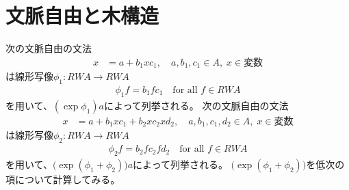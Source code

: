 \section{文脈自由と木構造}\label{s1:文脈自由と木構造} %
	次の文脈自由の文法
	\begin{equation*}\begin{split} %
		x &= a + b_1xc_1, \quad a,b_1,c_1\in A, \;x\in\text{変数}
	\end{split}\end{equation*} %
	は線形写像$\phi_1:RWA\to RWA$
	\begin{equation*}\begin{split} %
		\phi_1 f = b_1fc_1 \quad\text{for all }f\in RWA
	\end{split}\end{equation*} %
	を用いて、$(\exp \phi_1)a$によって列挙される。
	次の文脈自由の文法
	\begin{equation*}\begin{split} %
		x &= a + b_1xc_1 + b_2xc_2xd_2, 
		\quad a,b_1,c_1,d_2\in A, \;x\in\text{変数}
	\end{split}\end{equation*} %
	は線形写像$\phi_2:RWA\to RWA$
	\begin{equation*}\begin{split} %
		\phi_2 f = b_2fc_2fd_2 \quad\text{for all }f\in RWA
	\end{split}\end{equation*} %
	を用いて、$\bigl(\exp(\phi_1+\phi_2)\bigr)a$によって列挙される。
	$\bigl(\exp(\phi_1+\phi_2)\bigr)$を低次の項について計算してみる。
